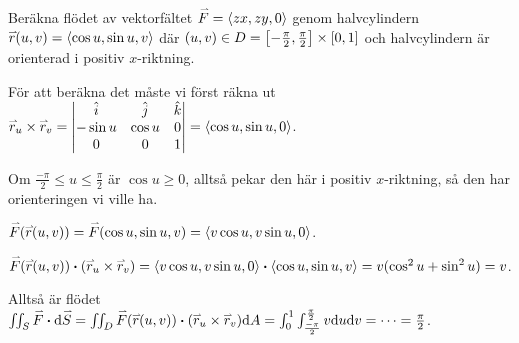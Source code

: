 \documentclass[a4paper]{article}
\begin{document}
\begin{ex}
    Beräkna flödet av vektorfältet \(
        \accentset{\rightharpoonup}{F} = \left\langle zx, zy, 0\right\rangle
    \) genom halvcylindern \(
        \accentset{\rightharpoonup}{r}(u,v) = \left\langle \cos u, \sin u, v \right\rangle
    \) där \(
        (u,v) \in D = \qty[ -\frac{\pi}{2} , \frac{\pi}{2}  ] \times \qty[ 0,1 ]
    \) och halvcylindern är orienterad i positiv \(
        x
    \)-riktning. 

    För att beräkna det måste vi först räkna ut \(
        \accentset{\rightharpoonup}{r}_u \times \accentset{\rightharpoonup}{r}_v = 
        \begin{vmatrix}
            \hat{i} & \hat{j} & \hat{k} \\ 
            -\sin u & \cos u & 0 \\ 
            0 & 0 & 1
        \end{vmatrix}
        = \left\langle \cos u, \sin u, 0 \right\rangle 
    \).

    Om \(
        \frac{-\pi}{2} \leq u \leq \frac{\pi}{2} 
    \) är \(
        \cos u \geq 0
    \), alltså pekar den här i positiv \(
        x
    \)-riktning, så den har orienteringen vi ville ha.

    \(
        \accentset{\rightharpoonup}{F}(\accentset{\rightharpoonup}{r}(u,v)) = \accentset{\rightharpoonup}{F}(\cos u, \sin u, v) 
            = \left\langle v \cos u, v \sin u, 0 \right\rangle
    \).

    \(
        \accentset{\rightharpoonup}{F}(\accentset{\rightharpoonup}{r}(u,v)) \boldsymbol{\cdot} (\accentset{\rightharpoonup}{r}_u \times \accentset{\rightharpoonup}{r}_v) 
            = \left\langle v \cos u, v \sin u, 0\right\rangle \boldsymbol{\cdot} \left\langle \cos u, \sin u, v \right\rangle
            = v ( \cos^2 u + \sin^2 u)
            = v
    \).

    Alltså är flödet \(
        \iint_S \accentset{\rightharpoonup}{F} \boldsymbol{\cdot} \dd \accentset{\rightharpoonup}{S} 
            = \iint_D \accentset{\rightharpoonup}{F}(\accentset{\rightharpoonup}{r}(u,v)) \boldsymbol{\cdot} (\accentset{\rightharpoonup}{r}_u \times \accentset{\rightharpoonup}{r}_v) \dd A 
            = \int_0^1 \int_\frac{-\pi}{2}^\frac{\pi}{2} v \dd u \dd v
            = \cdots = \frac{\pi}{2} 
    \).
\end{ex}
\end{document}

